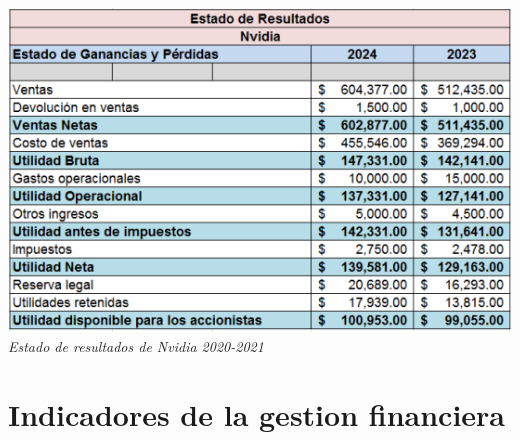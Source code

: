 \documentclass{article}
\begin{document}
\begin{center}
  \includegraphics[width=15cm]{./assets/estado_resultados.png}
  \textit{Estado de resultados de Nvidia 2020-2021}
\end{center}

\section{Indicadores de la gestion financiera}
\end{document}

